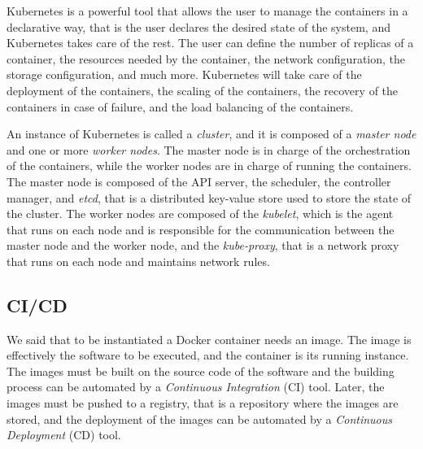 Kubernetes is a powerful tool that allows the user to manage the containers in a declarative way, that is the user declares the desired state of the system, and Kubernetes takes care of the rest. The user can define the number of replicas of a container, the resources needed by the container, the network configuration, the storage configuration, and much more. Kubernetes will take care of the deployment of the containers, the scaling of the containers, the recovery of the containers in case of failure, and the load balancing of the containers.

An instance of Kubernetes is called a \textit{cluster}, and it is composed of a \textit{master node} and one or more \textit{worker nodes}. The master node is in charge of the orchestration of the containers, while the worker nodes are in charge of running the containers. The master node is composed of the API server, the scheduler, the controller manager, and \textit{etcd}, that is a distributed key-value store used to store the state of the cluster. The worker nodes are composed of the \textit{kubelet}, which is the agent that runs on each node and is responsible for the communication between the master node and the worker node, and the \textit{kube-proxy}, that is a network proxy that runs on each node and maintains network rules.




\subsection{CI/CD}

We said that to be instantiated a Docker container needs an image. The image is effectively the software to be executed, and the container is its running instance. The images must be built on the source code of the software and the building process can be automated by a \textit{Continuous Integration} (CI) tool. Later, the images must be pushed to a registry, that is a repository where the images are stored, and the deployment of the images can be automated by a \textit{Continuous Deployment} (CD) tool.

